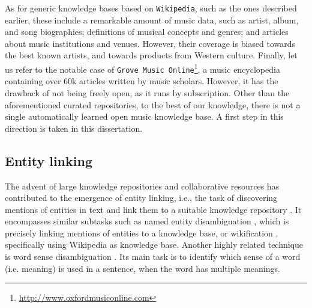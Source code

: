 As for generic knowledge bases based on \texttt{Wikipedia}, such as the ones described earlier, these include a remarkable amount of music data, such as artist, album, and song biographies; definitions of musical concepts and genres; and articles about music institutions and venues. However, their coverage is biased towards the best known artists, and towards products from Western culture. Finally, let us refer to the notable case of \texttt{Grove Music Online}\footnote{\url{http://www.oxfordmusiconline.com}}, a music encyclopedia containing over 60k articles written by music scholars. However, it has the drawback of not being freely open, as it runs by subscription.
Other than the aforementioned curated repositories, to the best of our knowledge, there is not a single automatically learned open music knowledge base. A first step in this direction is taken in this dissertation.



\subsection{Entity linking}
\label{sec:SOA:nlu:entity_linking}

The advent of large knowledge repositories and collaborative resources has contributed to the emergence of entity linking, i.e., the task of discovering mentions of entities in text and link them to a suitable knowledge repository \citep{Moroetal2014}. 
It encompasses similar subtasks such as named entity disambiguation \citep{BunescuandPasca2006}, which is precisely linking mentions of entities to a knowledge base, or wikification \citep{MihalceaandCsomai2007}, specifically using Wikipedia as knowledge base.
Another highly related technique is word sense disambiguation \citep{stevenson2003word}. Its main task is to identify which sense of a word (i.e. meaning) is used in a sentence, when the word has multiple meanings.


